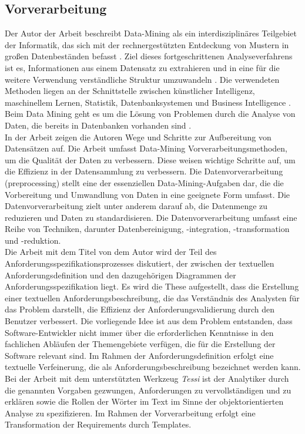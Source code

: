 \subsection*{Vorverarbeitung}
Der Autor \citeauthor{jain2013data} der Arbeit \cite{jain2013data} beschreibt Data-Mining als ein interdisziplinäres Teilgebiet der Informatik, das sich mit der rechnergestützten Entdeckung von Mustern in großen Datenbeständen befasst \cite{jain2013data}. Ziel dieses fortgeschrittenen Analyseverfahrens ist es, Informationen aus einem Datensatz zu extrahieren und in eine für die weitere Verwendung verständliche Struktur umzuwandeln \cite{jain2013data}. Die verwendeten Methoden liegen an der Schnittstelle zwischen künstlicher Intelligenz, maschinellem Lernen, Statistik, Datenbanksystemen und Business Intelligence \cite{jain2013data}. Beim Data Mining geht es um die Lösung von Problemen durch die Analyse von Daten, die bereits in Datenbanken vorhanden sind \cite{jain2013data}.\\

In der Arbeit \cite{alasadi2017review} zeigen die Autoren \citeauthor{alasadi2017review} Wege und Schritte zur Aufbereitung von Datensätzen auf. Die Arbeit umfasst Data-Mining Vorverarbeitungsmethoden, um die Qualität der Daten zu verbessern. Diese weisen wichtige Schritte auf, um die Effizienz in der Datensammlung zu verbessern. Die Datenvorverarbeitung (preprocessing) stellt eine der essenziellen Data-Mining-Aufgaben dar, die die Vorbereitung und Umwandlung von Daten in eine geeignete Form umfasst. Die Datenvorverarbeitung zielt unter anderem darauf ab, die Datenmenge zu reduzieren und Daten zu standardisieren. Die Datenvorverarbeitung umfasst eine Reihe von Techniken, darunter Datenbereinigung, -integration, -transformation und -reduktion. \\

Die Arbeit mit dem Titel \cite{kroha2000preprocessing} von dem Autor \citeauthor{kroha2000preprocessing} wird der Teil des Anforderungsspezifikationsprozesses diskutiert, der zwischen der textuellen Anforderungsdefinition und den dazugehörigen Diagrammen der Anforderungsspezifikation liegt. Es wird die These aufgestellt, dass die Erstellung einer textuellen Anforderungsbeschreibung, die das Verständnis des Analysten für das Problem darstellt, die Effizienz der Anforderungsvalidierung durch den Benutzer verbessert. Die vorliegende Idee ist aus dem Problem entstanden, dass Software-Entwickler nicht immer über die erforderlichen Kenntnisse in den fachlichen Abläufen der Themengebiete verfügen, die für die Erstellung der Software relevant sind. Im Rahmen der Anforderungsdefinition erfolgt eine textuelle Verfeinerung, die als Anforderungsbeschreibung bezeichnet werden kann. Bei der Arbeit mit dem unterstützten Werkzeug \emph{Tessi} ist der Analytiker durch die genannten Vorgaben gezwungen, Anforderungen zu vervollständigen und zu erklären sowie die Rollen der Wörter im Text im Sinne der objektorientierten Analyse zu spezifizieren. Im Rahmen der Vorverarbeitung erfolgt eine Transformation der Requirements durch Templates.
